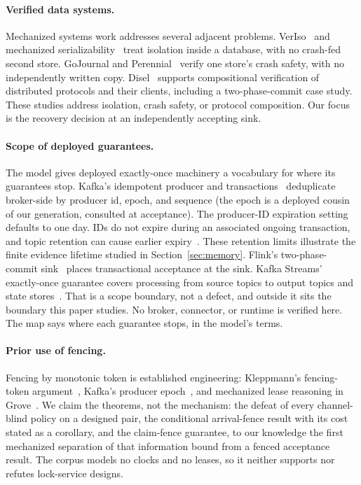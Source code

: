 \documentclass[sigplan,10pt]{acmart}
\theoremstyle{plain}
\theoremstyle{definition}
\begin{document}
\paragraph{Verified data systems.}
Mechanized systems work addresses several adjacent problems. VerIso~\cite{veriso} and mechanized
serializability~\cite{afp-serial} treat isolation inside a database,
with no crash-fed second store. GoJournal and
Perennial~\cite{gojournal,perennial} verify one store's crash
safety, with no independently written copy. Disel~\cite{disel} supports compositional verification of
distributed protocols and their clients, including a two-phase-commit
case study. These studies address isolation, crash safety, or protocol
composition. Our focus is the recovery decision at an independently
accepting sink.

\paragraph{Scope of deployed guarantees.}
The model gives deployed exactly-once machinery a vocabulary for
where its guarantees stop. Kafka's idempotent producer and
transactions~\cite{kip98} deduplicate broker-side by producer id,
epoch, and sequence (the epoch is a deployed cousin of our
generation, consulted at acceptance). The producer-ID expiration
setting defaults to one day. IDs do not expire during an associated
ongoing transaction, and topic retention can cause earlier
expiry~\cite{kafka-exp}. These retention limits illustrate the finite
evidence lifetime studied in Section~\ref{sec:memory}.
Flink's two-phase-commit sink~\cite{flink-docs,flink-blog} places
transactional acceptance at the sink. Kafka Streams' exactly-once guarantee
covers processing from source
topics to output topics and state stores~\cite{streams-eos}. That is
a scope boundary, not a defect, and outside it sits the boundary this
paper studies. No broker, connector, or runtime is verified here. The
map says where each guarantee stops, in the model's terms.

\paragraph{Prior use of fencing.}
Fencing by monotonic token is established engineering: Kleppmann's
fencing-token argument~\cite{klepp-lock}, Kafka's producer
epoch~\cite{kip98}, and mechanized lease reasoning in
Grove~\cite{grove}. We claim the theorems, not the mechanism: the
defeat of every channel-blind policy on a designed pair, the conditional
arrival-fence result with its cost stated as a corollary, and the
claim-fence guarantee, to our knowledge the first mechanized
separation of that information bound from a fenced acceptance result.
The corpus models no clocks and no leases, so it neither supports nor
refutes lock-service designs.
\end{document}
